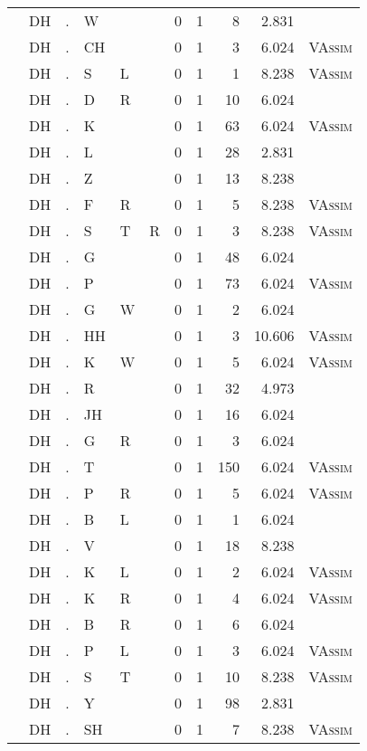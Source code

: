 \begin{longtable}{r@{ } r@{ } c@{ } l@{ } l@{ } l@{ } r r r r l }
 & DH & . & W &  &  & 0 & 1 & 8 & 2.831 &  \\
 & DH & . & CH &  &  & 0 & 1 & 3 & 6.024 & \textsc{VAssim} \\
 & DH & . & S & L &  & 0 & 1 & 1 & 8.238 & \textsc{VAssim} \\
 & DH & . & D & R &  & 0 & 1 & 10 & 6.024 &  \\
 & DH & . & K &  &  & 0 & 1 & 63 & 6.024 & \textsc{VAssim} \\
 & DH & . & L &  &  & 0 & 1 & 28 & 2.831 &  \\
 & DH & . & Z &  &  & 0 & 1 & 13 & 8.238 &  \\
 & DH & . & F & R &  & 0 & 1 & 5 & 8.238 & \textsc{VAssim} \\
 & DH & . & S & T & R & 0 & 1 & 3 & 8.238 & \textsc{VAssim} \\
 & DH & . & G &  &  & 0 & 1 & 48 & 6.024 &  \\
 & DH & . & P &  &  & 0 & 1 & 73 & 6.024 & \textsc{VAssim} \\
 & DH & . & G & W &  & 0 & 1 & 2 & 6.024 &  \\
 & DH & . & HH &  &  & 0 & 1 & 3 & 10.606 & \textsc{VAssim} \\
 & DH & . & K & W &  & 0 & 1 & 5 & 6.024 & \textsc{VAssim} \\
 & DH & . & R &  &  & 0 & 1 & 32 & 4.973 &  \\
 & DH & . & JH &  &  & 0 & 1 & 16 & 6.024 &  \\
 & DH & . & G & R &  & 0 & 1 & 3 & 6.024 &  \\
 & DH & . & T &  &  & 0 & 1 & 150 & 6.024 & \textsc{VAssim} \\
 & DH & . & P & R &  & 0 & 1 & 5 & 6.024 & \textsc{VAssim} \\
 & DH & . & B & L &  & 0 & 1 & 1 & 6.024 &  \\
 & DH & . & V &  &  & 0 & 1 & 18 & 8.238 &  \\
 & DH & . & K & L &  & 0 & 1 & 2 & 6.024 & \textsc{VAssim} \\
 & DH & . & K & R &  & 0 & 1 & 4 & 6.024 & \textsc{VAssim} \\
 & DH & . & B & R &  & 0 & 1 & 6 & 6.024 &  \\
 & DH & . & P & L &  & 0 & 1 & 3 & 6.024 & \textsc{VAssim} \\
 & DH & . & S & T &  & 0 & 1 & 10 & 8.238 & \textsc{VAssim} \\
 & DH & . & Y &  &  & 0 & 1 & 98 & 2.831 &  \\
 & DH & . & SH &  &  & 0 & 1 & 7 & 8.238 & \textsc{VAssim} \\

\end{longtable}

